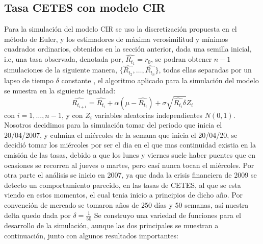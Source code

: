 \documentclass[11pt,notitlepage]{article}
\begin{document}
\subsection{Tasa CETES con modelo CIR}
Para la simulación del modelo CIR se uso la discretización propuesta en el método de Euler, y los estimadores de máxima verosimilitud y mínimos cuadrados ordinarios, obtenidos en la sección anterior, dada una semilla inicial, i.e, una tasa observada, denotada por, 
\(\hat{R_{t_1}} = r_{0}\), se podran obtener \(n-1\) simulaciones de la siguiente manera, \(\{\hat{R_{t_2}},\hdots,\hat{R_{t_n}}\}\), todas ellas separadas por un lapso de tiempo \(\delta\) constante , el algoritmo aplicado para la simulación del modelo se muestra en la siguiente igualdad: 
\[
    \hat{R_{t_{i+1}}} = \hat{R_{t_i}} + \alpha\left( \mu - \hat{R_{t_i}}\right) + \sigma \sqrt{\hat{R_{t_i}}\delta} Z_{i}
\]
con \(i = 1,\hdots,n-1\), y con \(Z_i\) variables aleatorias independientes \(N(0,1)\). 
Nosotros decidimos para la simulación tomar del periodo que inicia el 20/04/2007, y culmina el miércoles de la semana que inicia el 20/04/20, se decidió tomar los miércoles por ser el dia en el que mas continuidad existia en la emisión de las tasas, debido a que los lunes y viernes suele haber puentes que en ocasiones se recorren al jueves o martes, pero casí nunca tocan el miércoles. Por otra parte el análisis se inicio en 2007, ya que dada la crisis financiera de 2009 se detecto un comportamiento parecido, en las tasas de CETES, al que se esta viendo en estos momentos, el cual tenia inicio a principios de dicho año. Por convención de mercado se tomaron años de 250 días y 50 semanas, así nuestra delta quedo dada por \(\delta = \frac{1}{50}\) 
Se construyo una variedad de funciones para el desarrollo de la simulación, aunque las dos principales se muestran a continuación, junto con algunos resultados importantes: 
\end{document}
